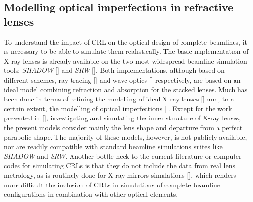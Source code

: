 
\begin{refsection}
\chapter{Modelling optical imperfections in refractive lenses}\label{sec:modelling}

To understand the impact of CRL on the optical design of complete beamlines, it is necessary to be able to simulate them realistically. The basic implementation of X-ray lenses is already available on the two most widespread beamline simulation tools: \textit{SHADOW} [\cite{SanchezdelRio2011}] and \textit{SRW} [\cite{Chubar1998}]. Both implementations, although based on different schemes, ray tracing [\cite{Alianelli2007}] and wave optics [\cite{Baltser2011}] respectively, are based on an ideal model combining refraction and absorption for the stacked lenses. Much has been done in terms of refining the modelling of ideal X-ray lenses [\cite{Umbach2008, SanchezdelRio2012, Osterhoff2013, Simons2017, Pedersen2018}] and, to a certain extent, the modelling of optical imperfections [\cite{Pantell2001, Andrejczuk2010, Gasilov2017, Osterhoff2017}]. Except for the work presented in [\cite{Roth2014}], investigating and simulating the inner structure of X-ray lenses, the present models consider mainly the lens shape and departure from a perfect parabolic shape. The majority of these models, however, is not publicly available, nor are readily compatible with standard beamline simulations suites like \textit{SHADOW} and \textit{SRW}. Another bottle-neck to the current literature or computer codes for simulating CRLs is that they do not include the data from real lens metrology, as is routinely done for X-ray mirrors simulations [\cite{SanchezDelRio2016}], which renders more difficult the inclusion of CRLs in simulations of complete beamline configurations in combination with other optical elements.


\end{refsection}
